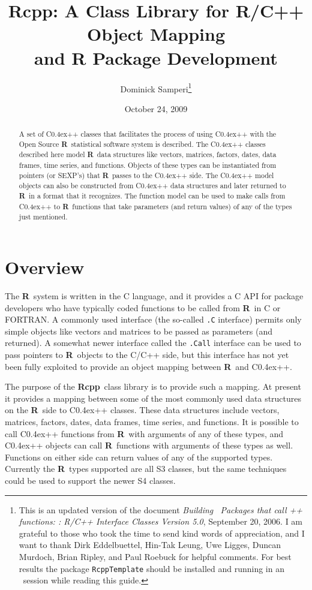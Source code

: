 \documentclass{article}
\title{{\bf Rcpp}: A Class Library for R/C++ Object Mapping
  \\ and R Package Development}
\date{October 24, 2009}
\author{Dominick Samperi\footnote{This is an updated version of the
    document {\em Building \R\ Packages that call \C++ functions: \Rcpp:
    R/C++ Interface Classes Version 5.0}, September 20, 2006. 
  I am grateful to
  those who took the time to send kind words of appreciation, and
  I want to thank
Dirk Eddelbuettel, Hin-Tak Leung, Uwe Ligges, Duncan Murdoch, Brian Ripley, and
Paul Roebuck for helpful comments. For
  best results the package {\tt RcppTemplate} should be installed and 
  running in an \R\ session  while reading this guide. 
}}
\def\C++{C{\raise 0.4ex\hbox{\tiny ++}}}
\newcommand{\R}{{\bf R}}
\newcommand{\Rcpp}{{\bf Rcpp}}
\begin{document}
\maketitle
\begin{abstract}
\noindent A set of \C++ classes that facilitates the process of using
\C++ with the Open Source \R\ statistical software system is described.
The \C++ classes described here model \R\ data structures
like vectors, matrices, factors, dates, data frames, time series,
and functions. Objects of these types can be instantiated from 
pointers (or SEXP's) that
\R\ passes to the \C++ side. The \C++ model objects can also be 
constructed from \C++ data
structures and later returned to \R\ in a format that it recognizes. The
function model can be used to make calls from \C++ to \R\ functions that
take parameters (and return values) of any of the types just mentioned.
\end{abstract}


\section{Overview}
\label{sec.overview}

The \R\ system is written in the C language, and it provides a C API for
package developers who have typically coded functions to be called from \R\
in C or FORTRAN. A commonly used interface
(the so-called {\tt .C} interface)
permits only simple objects like vectors and matrices to be passed as
parameters (and returned). A somewhat newer interface called the
{\tt .Call} interface can be used to pass pointers to \R\ objects to
the C/C++ side, but this interface has not yet been fully exploited to
provide an object mapping between \R\ and \C++. 

The purpose of the
\Rcpp\ class library is to provide such a mapping. At present it provides
a mapping between some of the most commonly used data structures on the
\R\ side to \C++ classes. These data structures include vectors, 
matrices, factors, dates, data frames, time series, and functions.
It is possible to call \C++ functions from \R\ with arguments of any of
these types, and \C++ objects can call \R\ functions with arguments of
these types as well. Functions on either side can return values of any
of the supported types.
Currently the \R\ types supported are all S3 classes, but the 
same techniques
could be used to support the newer S4 classes.
\end{document}
